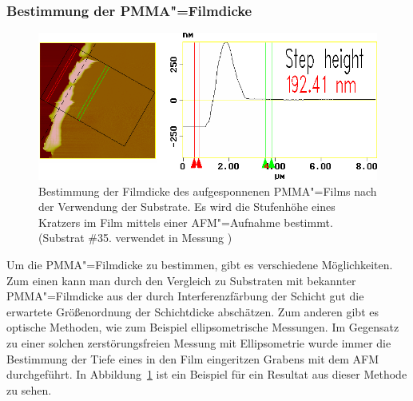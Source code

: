 \subsubsection{Bestimmung der PMMA"=Filmdicke}
\begin{figure}[h!tbp]
	\centerline{\includegraphics[width=\midwidth]{exp_substrate/sh0109d2}}
	\caption[Bestimmung der PMMA"=Filmdicke]{Bestimmung der Filmdicke des aufgesponnenen PMMA"=Films nach der Verwendung der Substrate. Es wird die Stufenhöhe eines Kratzers im Film mittels einer AFM"=Aufnahme bestimmt. (Substrat \#35. verwendet in Messung )}
	\label{fig:pmma_thickness}
\end{figure}
Um die PMMA"=Filmdicke zu bestimmen, gibt es verschiedene Möglichkeiten. Zum einen kann man durch den Vergleich zu Substraten mit bekannter PMMA"=Filmdicke aus der durch Interferenzfärbung der Schicht gut die erwartete Größenordnung der Schichtdicke abschätzen. Zum anderen gibt es optische Methoden, wie zum Beispiel ellipsometrische Messungen. Im Gegensatz zu einer solchen zerstörungsfreien Messung mit Ellipsometrie wurde immer die Bestimmung der Tiefe eines in den Film eingeritzen Grabens mit dem AFM durchgeführt.
In Abbildung~\ref{fig:pmma_thickness} ist ein Beispiel für ein Resultat aus dieser Methode zu sehen.
